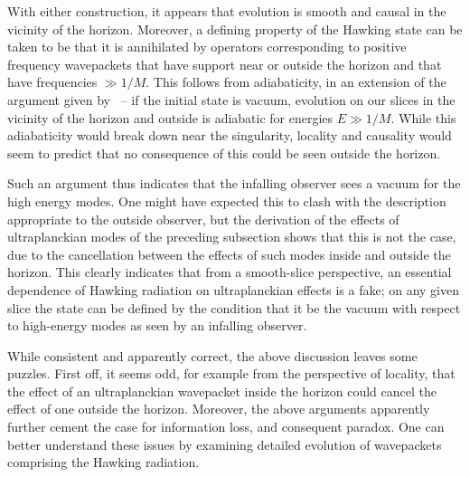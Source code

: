 With either construction, it appears that evolution is smooth and causal in the vicinity of the horizon.  Moreover, 
a defining property of the Hawking state can be taken to be that it is annihilated by operators corresponding to positive frequency wavepackets that have support near or outside the horizon and that have frequencies $\gg 1/M$.  This follows from adiabaticity, in an extension of the argument given by \LPSTU\ -- if the initial state is vacuum, evolution on our slices in the vicinity of the horizon and outside is adiabatic for energies $E\gg 1/M$.  While this adiabaticity would break down near the singularity, locality and causality would seem to predict that no consequence of this could be seen outside the horizon.  

Such an argument thus indicates that the infalling observer sees a vacuum for the high energy modes.  One might have expected this to clash with the description appropriate to the outside observer, but the derivation of the effects of ultraplanckian modes of the preceding subsection shows that this is not the case, due to the cancellation between the effects of such modes inside and outside the horizon.  This clearly indicates that from a smooth-slice perspective, an essential dependence of Hawking radiation on ultraplanckian effects is a fake; on any given slice the state can be defined by the condition that it be the vacuum with respect to high-energy modes as seen by an infalling observer.  


While consistent and apparently correct, the above discussion leaves some puzzles.  First off, it seems odd, for example from the perspective of locality, that the effect of an ultraplanckian wavepacket inside the horizon could cancel the effect of one outside the horizon.  Moreover, the above arguments apparently further cement the case for information loss, and consequent paradox.  One can better understand these issues by examining detailed evolution of  wavepackets comprising the Hawking radiation.

